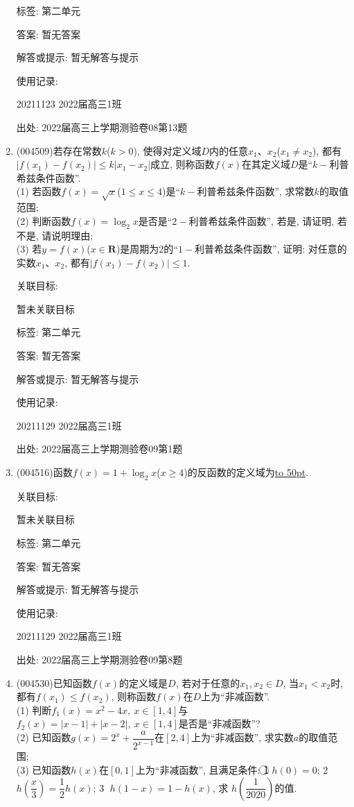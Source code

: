 \documentclass[10pt,a4paper]{article}
\newcommand{\blank}[1]{\underline{\hbox to #1pt{}}}
\begin{document}
\begin{enumerate}[1.]
标签: 第二单元

答案: 暂无答案

解答或提示: 暂无解答与提示

使用记录:

20211123	2022届高三1班	


出处: 2022届高三上学期测验卷08第13题
\item { (004509)}若存在常数$k$($k>0$), 使得对定义域$D$内的任意$x_1$、$x_2$($x_1\ne x_2$), 都有$|f(x_1)-f(x_2)|\le k|x_1-x_2|$成立, 则称函数$f(x)$在其定义域$D$是``$k-$利普希兹条件函数''.\\
(1) 若函数$f(x)=\sqrt x$($1\le x\le 4$)是``$k-$利普希兹条件函数'', 求常数$k$的取值范围;\\
(2) 判断函数$f(x)=\log_2x$是否是``$2-$利普希兹条件函数'', 若是, 请证明, 若不是, 请说明理由;\\
(3) 若$y=f(x)$($x\in \mathbf{R}$)是周期为2的``$1-$利普希兹条件函数'', 证明: 对任意的实数$x_1$、$x_2$, 都有$|f(x_1)-f(x_2)|\le 1$.


关联目标:

暂未关联目标



标签: 第二单元

答案: 暂无答案

解答或提示: 暂无解答与提示

使用记录:

20211129	2022届高三1班	


出处: 2022届高三上学期测验卷09第1题
\item { (004516)}函数$f(x)=1+\log_2x$($x\ge 4$)的反函数的定义域为\blank{50}.


关联目标:

暂未关联目标



标签: 第二单元

答案: 暂无答案

解答或提示: 暂无解答与提示

使用记录:

20211129	2022届高三1班	


出处: 2022届高三上学期测验卷09第8题
\item { (004530)}已知函数$f(x)$的定义域是$D$, 若对于任意的$x_1,x_2\in D$, 当$x_1<x_2$时, 都有$f(x_1)\le f(x_2)$, 则称函数$f(x)$在$D$上为``非减函数''.\\
(1) 判断$f_1(x)=x^2-4x, \ x\in [1,4]$与$f_2(x)=|x-1|+|x-2|, \ x\in [1,4]$是否是``非减函数''?\\
(2) 已知函数$g(x)=2^x+\dfrac a{2^{x-1}}$在$[2,4]$上为``非减函数'', 求实数$a$的取值范围;\\
(3) 已知函数$h(x)$在$[0,1]$上为``非减函数'', 且满足条件:
\textcircled{1}  $h(0)=0$; \textcircled{2}  $h(\dfrac x3)=\dfrac 12h(x)$; \textcircled{3}  $h(1-x)=1-h(x)$, 求 $h(\dfrac 1{2020})$的值.



\end{enumerate}
\end{document}

